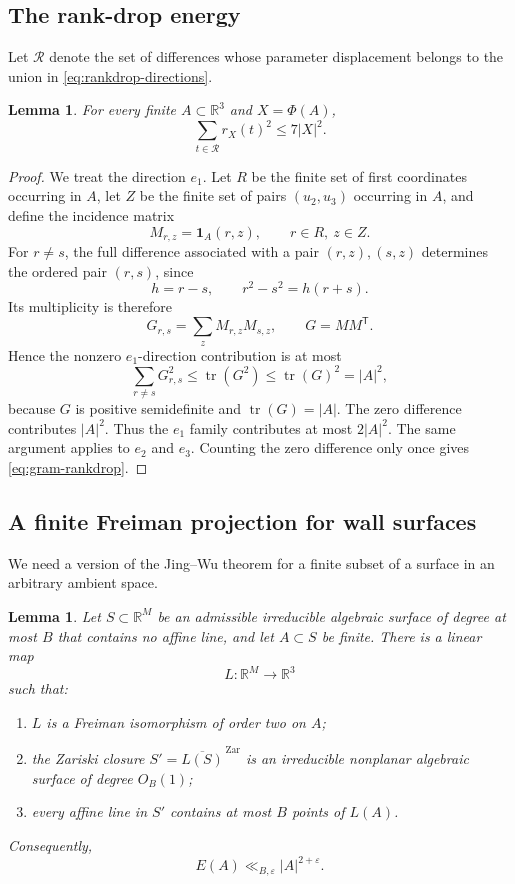 \documentclass[11pt]{amsart}
\numberwithin{equation}{section}
\newtheorem{lemma}[theorem]{Lemma}
\theoremstyle{definition}
\theoremstyle{remark}
\newcommand{\R}{\mathbb R}
\newcommand{\cR}{\mathcal R}
\newcommand{\eps}{\varepsilon}
\newcommand{\1}{\mathbf 1}
\newcommand{\card}[1]{\lvert #1\rvert}
\begin{document}
\subsection{The rank-drop energy}
Let $\cR$ denote the set of differences whose parameter displacement belongs to the union in \eqref{eq:rankdrop-directions}.

\begin{lemma}\label{lem:gram-rankdrop}
For every finite $A\subset\R^3$ and $X=\Phi(A)$,
\begin{equation}\label{eq:gram-rankdrop}
 \sum_{t\in\cR}r_X(t)^2\leq 7\card X^2.
\end{equation}
\end{lemma}

\begin{proof}
We treat the direction $e_1$.  Let $R$ be the finite set of first coordinates occurring in $A$, let $Z$ be the finite set of pairs $(u_2,u_3)$ occurring in $A$, and define the incidence matrix
\[
 M_{r,z}=\1_A(r,z),
 \qquad r\in R,\ z\in Z.
\]
For $r\neq s$, the full difference associated with a pair $(r,z),(s,z)$ determines the ordered pair $(r,s)$, since
\[
 h=r-s,
 \qquad
 r^2-s^2=h(r+s).
\]
Its multiplicity is therefore
\[
 G_{r,s}=\sum_zM_{r,z}M_{s,z},
 \qquad G=MM^{\mathsf T}.
\]
Hence the nonzero $e_1$-direction contribution is at most
\[
 \sum_{r\neq s}G_{r,s}^2
 \leq\operatorname{tr}(G^2)
 \leq\operatorname{tr}(G)^2
 =\card A^2,
\]
because $G$ is positive semidefinite and $\operatorname{tr}(G)=\card A$.  The zero difference contributes $\card A^2$.  Thus the $e_1$ family contributes at most $2\card A^2$.  The same argument applies to $e_2$ and $e_3$.  Counting the zero difference only once gives \eqref{eq:gram-rankdrop}.
\end{proof}

\subsection{A finite Freiman projection for wall surfaces}
We need a version of the Jing--Wu theorem for a finite subset of a surface in an arbitrary ambient space.

\begin{lemma}\label{lem:freiman-projection}
Let $S\subset\R^M$ be an admissible irreducible algebraic surface of degree at most $B$ that contains no affine line, and let $A\subset S$ be finite.  There is a linear map
\[
 L:\R^M\longrightarrow\R^3
\]
such that:
\begin{enumerate}[label=(\roman*)]
 \item $L$ is a Freiman isomorphism of order two on $A$;
 \item the Zariski closure $S'=\overline{L(S)}^{\,\mathrm{Zar}}$ is an irreducible nonplanar algebraic surface of degree $O_B(1)$;
 \item every affine line in $S'$ contains at most $B$ points of $L(A)$.
\end{enumerate}
Consequently,
\begin{equation}\label{eq:surface-any-ambient}
 E(A)\ll_{B,\eps}\card A^{2+\eps}.
\end{equation}
\end{lemma}
\end{document}
